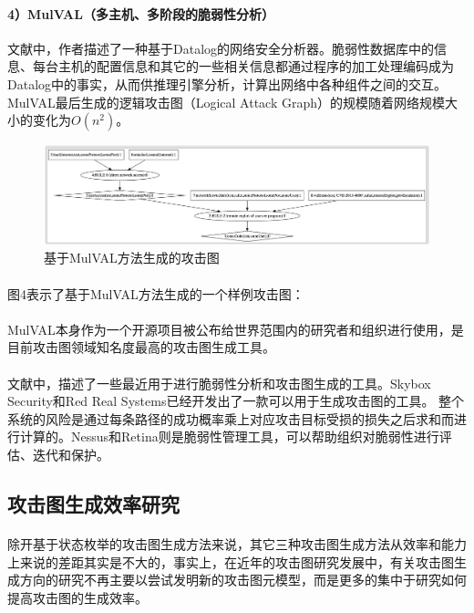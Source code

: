 \documentclass[12pt,a4paper]{article}
\begin{document}
\paragraph{4）MulVAL（多主机、多阶段的脆弱性分析）}
文献\cite{8}\cite{9}中，作者描述了一种基于Datalog的网络安全分析器。脆弱性数据库中的信息、每台主机的配置信息和其它的一些相关信息都通过程序的加工处理编码成为Datalog中的事实，从而供推理引擎分析，计算出网络中各种组件之间的交互。MulVAL最后生成的逻辑攻击图（Logical Attack Graph）的规模随着网络规模大小的变化为$O(n^2)$。
\begin{figure}[!htp]
	\centering
	\includegraphics[scale=0.40]{images/MulVAL.jpg} 
	\caption{基于MulVAL方法生成的攻击图}
\end{figure}
\paragraph{}
图4表示了基于MulVAL方法生成的一个样例攻击图：
\paragraph{}
MulVAL本身作为一个开源项目被公布给世界范围内的研究者和组织进行使用，是目前攻击图领域知名度最高的攻击图生成工具。

\paragraph{}
文献\cite{10}\cite{11}\cite{12}\cite{13}中，描述了一些最近用于进行脆弱性分析和攻击图生成的工具。Skybox Security\cite{10}和Red Real Systems\cite{11}已经开发出了一款可以用于生成攻击图的工具。
整个系统的风险是通过每条路径的成功概率乘上对应攻击目标受损的损失之后求和而进行计算的。Nessus\cite{12}和Retina\cite{13}则是脆弱性管理工具，可以帮助组织对脆弱性进行评估、迭代和保护。

\subsection{攻击图生成效率研究}
\paragraph{}
除开基于状态枚举的攻击图生成方法来说，其它三种攻击图生成方法从效率和能力上来说的差距其实是不大的，事实上，在近年的攻击图研究发展中，有关攻击图生成方向的研究不再主要以尝试发明新的攻击图元模型，而是更多的集中于研究如何提高攻击图的生成效率。
\end{document}
